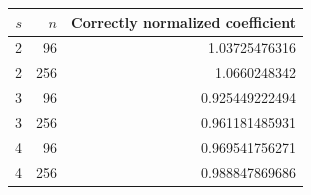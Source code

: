 \begin{tabular}{rrr}
\toprule
$s$ & $n$ & Correctly normalized coefficient \\
\midrule
2 & 96 & 1.03725476316 \\
2 & 256 & 1.0660248342 \\
3 & 96 & 0.925449222494 \\
3 & 256 & 0.961181485931 \\
4 & 96 & 0.969541756271 \\
4 & 256 & 0.988847869686 \\
\bottomrule
\end{tabular}
